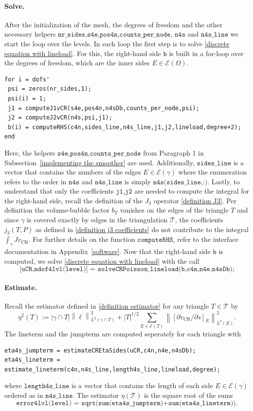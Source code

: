 \documentclass[11pt,a4paper]{article}
\newcommand{\vCR}{v_{\mathrm{CR}}}
\newcommand{\norm}[1]{\left \lVert #1 \right \rVert}
\begin{document}
\paragraph{Solve.}
After the initialization of the mesh, the degrees of freedom and the other necessary helpers \(\texttt{nr\_sides,s4e,pos4n,counts\_per\_node, n4s}\) and \(\texttt{n4s\_line}\) we start the loop over the levels. In each loop the first step is to solve \eqref{discrete equation with lineload}. For this, the right-hand side \(\texttt{b}\) is built in a for-loop over the degrees of freedom, which are  the inner sides \(E \in \mathcal{E}(\Omega)\). 
\begin{lstlisting}
for i = dofs'
 psi = zeros(nr_sides,1);
 psi(i) = 1;
 j1 = computeJ1vCR(s4e,pos4n,n4sDb,counts_per_node,psi);
 j2 = computeJ2vCR(n4s,psi,j1);
 b(i) = computeRHS(c4n,sides_line,n4s_line,j1,j2,lineload,degree+2);
end
\end{lstlisting}
Here, the helpers \(\texttt{s4e,pos4n,counts\_per\_node}\) from Paragraph 1 in Subsection~\ref{implementing the smoother} are used. Additionally, \(\texttt{sides\_line}\) is a vector that contains the numbers of the edges \(E \in \mathcal{E}(\gamma)\) where the enumeration refers to the order in \(\texttt{n4s}\) and \(\texttt{n4s\_line}\) is simply \(\texttt{n4s(sides\_line,:)}\). Lastly, to understand that only the coefficients \(\texttt{j1,j2}\) are needed to compute the integral for the right-hand side, recall the definition of the \(J_3\) operator \eqref{definition J3}. Per definition the volume-bubble factor \(b_T\) vanishes on the edges of the triangle \(T\) and since \(\gamma\) is covered exactly by edges in the triangulation \(\mathcal{T}\), the coefficients \(j_3(T,P)\) as defined in \eqref{definition j3 coefficients} do not contribute to the integral \(\int_\gamma J\vCR\).
For further details on the function \(\texttt{computeRHS}\), refer to the interface documentation in Appendix~\ref{software}. Now that the right-hand side \(\texttt{b}\) is computed, we solve \eqref{discrete equation with lineload} with the call
\[
\texttt{[uCR,ndof4lvl(level)] = solveCRPoisson\_lineload(b,c4n,n4e,n4sDb);}
\]

\paragraph{Estimate.}
Recall the estimator defined in \eqref{definition estimator} for any triangle \(T \in \mathcal{T}\) by
\[
\eta^2(T) := |\gamma \cap T| \norm{\ell}^2_{L^2(\gamma \cap T)} + |T|^{1/2} \sum_{E \in \mathcal{E}(T)} \norm{[\partial \vCR/\partial s]_E}^2_{L^2(E)}.
\]
The lineterm and the jumpterm are computed seperately for each triangle with
\begin{lstlisting}
eta4s_jumpterm = estimateCREtaSides(uCR,c4n,n4e,n4sDb);
eta4s_lineterm = estimate_lineterm(c4n,n4s_line,length4s_line,lineload,degree);
\end{lstlisting}
where \(\texttt{length4s\_line}\) is a vector that contains the length of each side \(E \in \mathcal{E}(\gamma)\) ordered as in \(\texttt{n4s\_line}\).
The estimator \(\eta(\mathcal{T})\) is the square root of the sums
\[\texttt{error4lvl(level) = sqrt(sum(eta4s\_jumpterm)+sum(eta4s\_lineterm))}.\]
\end{document}
